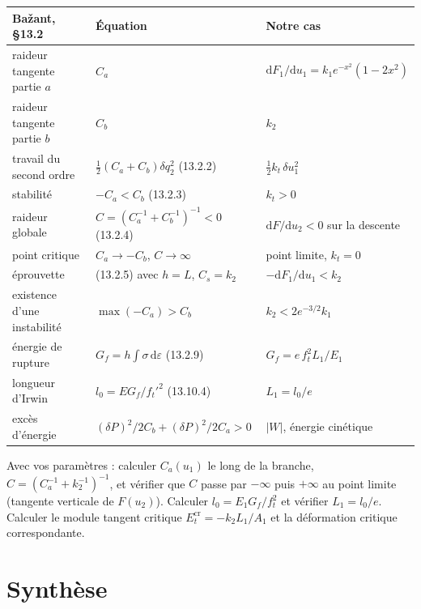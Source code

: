 \documentclass[11pt,a4paper]{article}
\newcommand{\dd}{\mathrm{d}}
\begin{document}
\begin{center}
\begin{tabular}{@{}p{4.4cm}p{4.6cm}p{5.2cm}@{}}
\toprule
Bažant, §13.2 & Équation & Notre cas\\
\midrule
raideur tangente partie $a$ & $C_a$ & $\dd F_1/\dd u_1 = k_1e^{-x^2}(1-2x^2)$\\
raideur tangente partie $b$ & $C_b$ & $k_2$\\
travail du second ordre & $\tfrac12(C_a+C_b)\delta q_2^2$ (13.2.2) & $\tfrac12k_t\,\delta u_1^2$\\
stabilité & $-C_a < C_b$ (13.2.3) & $k_t > 0$\\
raideur globale & $C = (C_a^{-1}+C_b^{-1})^{-1} < 0$ (13.2.4) & $\dd F/\dd u_2 < 0$ sur la descente\\
point critique & $C_a \to -C_b$, $C\to\infty$ & point limite, $k_t = 0$\\
éprouvette & (13.2.5) avec $h = L$, $C_s = k_2$ & $-\dd F_1/\dd u_1 < k_2$\\
existence d'une instabilité & $\max(-C_a) > C_b$ & $k_2 < 2e^{-3/2}k_1$\\
énergie de rupture & $G_f = h\int\sigma\,\dd\varepsilon$ (13.2.9) & $G_f = e\,f_t^2L_1/E_1$\\
longueur d'Irwin & $l_0 = EG_f/f_t'^2$ (13.10.4) & $L_1 = l_0/e$\\
excès d'énergie & $(\delta P)^2/2C_b + (\delta P)^2/2C_a > 0$ & $|W|$, énergie cinétique\\
\bottomrule
\end{tabular}
\end{center}

\begin{alamain}
Avec vos paramètres : calculer $C_a(u_1)$ le long de la branche, $C = (C_a^{-1}+k_2^{-1})^{-1}$,
et vérifier que $C$ passe par $-\infty$ puis $+\infty$ au point limite (tangente verticale de
$F(u_2)$). Calculer $l_0 = E_1G_f/f_t^2$ et vérifier $L_1 = l_0/e$. Calculer le module tangent
critique $E_t^{\text{cr}} = -k_2L_1/A_1$ et la déformation critique correspondante.
\end{alamain}

\section{Synthèse}
\end{document}
